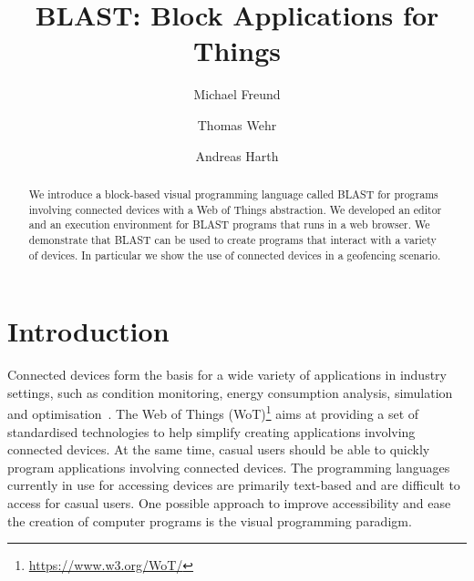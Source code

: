 \documentclass[runningheads]{llncs}
\begin{document}
%
\title{BLAST: Block Applications for Things}
%
%
\author{Michael Freund \and
Thomas Wehr \and
Andreas Harth}
%
%
%
\maketitle              %
%
\begin{abstract}
  We introduce a block-based visual programming language called BLAST for programs involving connected devices with a Web of Things abstraction.
  We developed an editor and an execution environment for BLAST programs that runs in a web browser.
  We demonstrate that BLAST can be used to create programs that interact with a variety of devices.
  In particular we show the use of connected devices in a geofencing scenario.
\end{abstract}
%
%
%
\setcounter{footnote}{0}
\section{Introduction}
Connected devices form the basis for a wide variety of applications in industry settings, such as condition monitoring, energy consumption analysis, simulation and optimisation~\cite{CIMINO2019103130}.
The Web of Things (WoT)\footnote{\url{https://www.w3.org/WoT/}} aims at providing a set of standardised technologies to help simplify creating applications involving connected devices.
At the same time, casual users should be able to quickly program applications involving connected devices.
The programming languages currently in use for accessing devices are primarily text-based and are difficult to access for casual users.
One possible approach to improve accessibility and ease the creation of computer programs is the visual programming paradigm.
\end{document}
